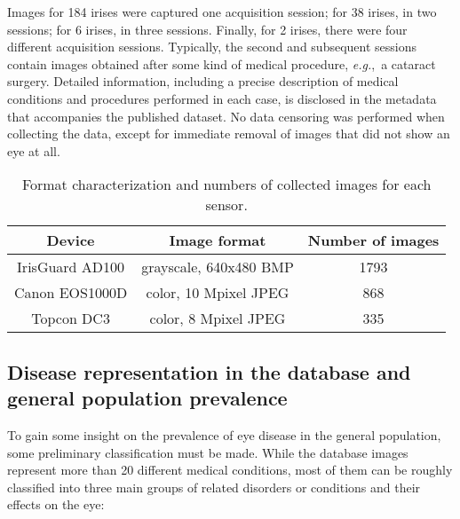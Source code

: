 \documentclass[article,12pt]{elsarticle}
\newcommand{\eg}{{\it e.g.},~}
\begin{document}
Images for 184 irises were captured one acquisition session; for 38 irises, in two sessions; for 6 irises, in three sessions. Finally, for 2 irises, there were four different acquisition sessions. Typically, the second and subsequent sessions contain images obtained after some kind of medical procedure, \eg a cataract surgery. Detailed information, including a precise description of medical conditions and procedures performed in each case, is disclosed in the metadata that accompanies the published dataset. No data censoring was performed when collecting the data, except for immediate removal of images that did not show an eye at all.

\begin{table}[!htb]
\renewcommand{\arraystretch}{1.1}
\caption{Format characterization and numbers of collected images for each sensor.}
\label{table:database_summary}
\centering\footnotesize
\begin{tabular}[t]{|c|c|c|}
\hline
\textbf{Device} & \textbf{Image format} & \textbf{Number of images}\\
\hline
\hline
IrisGuard AD100 & grayscale, 640x480 BMP & 1793\\
\hline
Canon EOS1000D & color, 10 Mpixel JPEG & 868\\
\hline
Topcon DC3 & color, 8 Mpixel
 JPEG & 335\\
\hline
\end{tabular}
\end{table}

\subsection{Disease representation in the database and general population prevalence} 

To gain some insight on the prevalence of eye disease in the general population, some preliminary classification must be made. While the database images represent more than 20 different medical conditions, most of them can be roughly classified into three main groups of related disorders or conditions and their effects on the eye:
\end{document}
